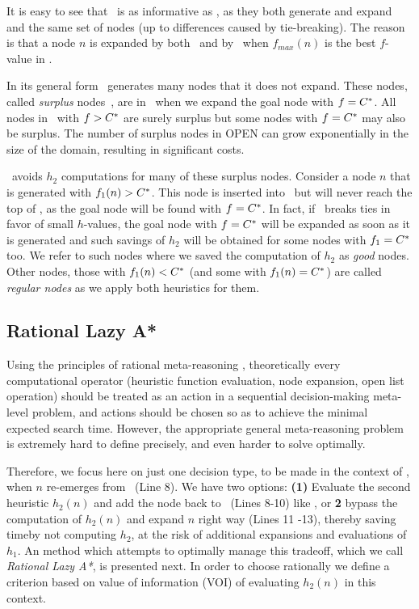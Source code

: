 It is easy to see that \lazyastar~is as informative as \astarmax, as they both
generate and expand and the same set of nodes (up to differences caused by
tie-breaking). The reason is that a node $n$ is expanded by both \astarmax~and
by \lazyastar~when $f_{max}(n)$ is the best $f$-value in \OPEN. %

In its general form \astar~generates many nodes that it does not expand. These
nodes, called {\em surplus} nodes~\cite{Felner2012}, are in \OPEN~when we
expand the goal node with $f=C^\ast$. All nodes in \OPEN~with $f>C^\ast$ are
surely surplus but some nodes with $f=C^\ast$ may also be surplus. The number
of surplus nodes in OPEN can grow exponentially in the size of the domain, resulting in
significant costs.

\lazyastar~avoids $h_2$ computations for many of these surplus nodes. Consider
a node $n$ that is generated with $f_1(n) > C^\ast$. This node is inserted
into \OPEN~but will never reach the top of \OPEN, as the goal node will be found
with $f=C^\ast$. In fact, if \OPEN~breaks ties in favor of small $h$-values,
the goal node with $f=C^\ast$ will be expanded as soon as it is generated and such
savings of $h_2$ will be obtained for some nodes with $f_1=C^\ast$ too. We
refer to such nodes where we saved the computation of $h_2$ as {\em good} nodes. Other nodes,
those with $f_1(n) < C^\ast$ (and some with $f_1(n) = C^\ast$) are called
{\em regular nodes} as we apply both heuristics for them.

\subsection{Rational Lazy A*}

Using the principles of rational meta-reasoning \cite{Russell.right},
theoretically every computational operator (heuristic function evaluation, node
expansion, open list operation) should be treated as an action in a sequential
decision-making meta-level problem, and actions should be chosen so as to
achieve the minimal expected search time. However, the appropriate
general meta-reasoning problem is extremely hard to define precisely, and even harder
to solve optimally.

Therefore, we focus here on just one decision type, to be
made in the context of \lazyastar, when $n$ re-emerges from \OPEN~(Line 8).
We have two options: {\bf (1)}  Evaluate the second heuristic $h_2(n)$ and add
the node back to \OPEN~(Lines 8-10) like \lazyastar, or {\bf 2} bypass the
computation of $h_2(n)$ and expand $n$ right way (Lines 11 -13), thereby
saving timeby not computing $h_2$, at the risk of additional expansions and evaluations of $h_1$.
An method which attempts to
optimally manage this tradeoff, which we call \textit{Rational Lazy A*}, is presented next.
In order to choose rationally we define a criterion based on value of
information (VOI) of evaluating $h_2(n)$ in this context.


